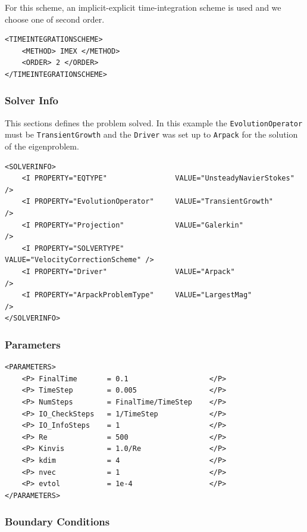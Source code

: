 For this scheme, an implicit-explicit time-integration scheme is used
and we choose one of second order.

    \begin{lstlisting}[style=XMLStyle]
<TIMEINTEGRATIONSCHEME>
    <METHOD> IMEX </METHOD>
    <ORDER> 2 </ORDER>
</TIMEINTEGRATIONSCHEME>
      \end{lstlisting}

\subsubsection{Solver Info}

This sections defines the problem solved. In this example the \texttt{EvolutionOperator} must be \texttt{TransientGrowth} and the \texttt{Driver} was set up to \texttt{Arpack} for the solution of the eigenproblem.

      \begin{lstlisting}[style=XMLStyle]
<SOLVERINFO>
    <I PROPERTY="EQTYPE"                VALUE="UnsteadyNavierStokes"     />
    <I PROPERTY="EvolutionOperator"     VALUE="TransientGrowth"          />
    <I PROPERTY="Projection"            VALUE="Galerkin"                 />
    <I PROPERTY="SOLVERTYPE"            VALUE="VelocityCorrectionScheme" />
    <I PROPERTY="Driver"                VALUE="Arpack"                   />
    <I PROPERTY="ArpackProblemType"     VALUE="LargestMag"               />
</SOLVERINFO>
                \end{lstlisting}


\subsubsection{Parameters}

      \begin{lstlisting}[style=XMLStyle]
<PARAMETERS>
    <P> FinalTime       = 0.1                   </P>
    <P> TimeStep        = 0.005                 </P>
    <P> NumSteps        = FinalTime/TimeStep    </P>
    <P> IO_CheckSteps   = 1/TimeStep            </P>
    <P> IO_InfoSteps    = 1                     </P>
    <P> Re              = 500                   </P>
    <P> Kinvis          = 1.0/Re                </P>
    <P> kdim            = 4                     </P>
    <P> nvec            = 1                     </P>
    <P> evtol           = 1e-4                  </P>
</PARAMETERS>
                        \end{lstlisting}


\subsubsection{Boundary Conditions}

